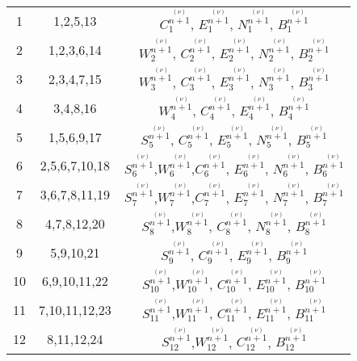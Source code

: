 \begin{center}
\begin{longtable}[htbp]{c c c}
		1	&	1,2,5,13	&	$C^{\stackrel{(\nu)}{n+1}}_{1}$, $E^{\stackrel{(\nu)}{n+1}}_{1}$, $N^{\stackrel{(\nu)}{n+1}}_{1}$, $B^{\stackrel{(\nu)}{n+1}}_{1}$ 	\\
		2	&	1,2,3,6,14	&	$W^{\stackrel{(\nu)}{n+1}}_{2}$, $C^{\stackrel{(\nu)}{n+1}}_{2}$, $E^{\stackrel{(\nu)}{n+1}}_{2}$, $N^{\stackrel{(\nu)}{n+1}}_{2}$, $B^{\stackrel{(\nu)}{n+1}}_{2}$	\\
		3	&	2,3,4,7,15	&	$W^{\stackrel{(\nu)}{n+1}}_{3}$, $C^{\stackrel{(\nu)}{n+1}}_{3}$, $E^{\stackrel{(\nu)}{n+1}}_{3}$, $N^{\stackrel{(\nu)}{n+1}}_{3}$, $B^{\stackrel{(\nu)}{n+1}}_{3}$	\\
		4	&	3,4,8,16	&	$W^{\stackrel{(\nu)}{n+1}}_{4}$, $C^{\stackrel{(\nu)}{n+1}}_{4}$, $E^{\stackrel{(\nu)}{n+1}}_{4}$, $B^{\stackrel{(\nu)}{n+1}}_{4}$	\\
		5	&	1,5,6,9,17	&	$S^{\stackrel{(\nu)}{n+1}}_{5}$, $C^{\stackrel{(\nu)}{n+1}}_{5}$, $E^{\stackrel{(\nu)}{n+1}}_{5}$, $N^{\stackrel{(\nu)}{n+1}}_{5}$, $B^{\stackrel{(\nu)}{n+1}}_{5}$	\\
		6	&	2,5,6,7,10,18	&	$S^{\stackrel{(\nu)}{n+1}}_{6}$,$W^{\stackrel{(\nu)}{n+1}}_{6}$,$C^{\stackrel{(\nu)}{n+1}}_{6}$, $E^{\stackrel{(\nu)}{n+1}}_{6}$, $N^{\stackrel{(\nu)}{n+1}}_{6}$, $B^{\stackrel{(\nu)}{n+1}}_{6}$	\\
		7	&	3,6,7,8,11,19	&	$S^{\stackrel{(\nu)}{n+1}}_{7}$,$W^{\stackrel{(\nu)}{n+1}}_{7}$,$C^{\stackrel{(\nu)}{n+1}}_{7}$, $E^{\stackrel{(\nu)}{n+1}}_{7}$, $N^{\stackrel{(\nu)}{n+1}}_{7}$, $B^{\stackrel{(\nu)}{n+1}}_{7}$	\\
		8	&	4,7,8,12,20	&	$S^{\stackrel{(\nu)}{n+1}}_{8}$,$W^{\stackrel{(\nu)}{n+1}}_{8}$, $C^{\stackrel{(\nu)}{n+1}}_{8}$, $N^{\stackrel{(\nu)}{n+1}}_{8}$, $B^{\stackrel{(\nu)}{n+1}}_{8}$	\\
		9	&	5,9,10,21	&	$S^{\stackrel{(\nu)}{n+1}}_{9}$, $C^{\stackrel{(\nu)}{n+1}}_{9}$, $E^{\stackrel{(\nu)}{n+1}}_{9}$, $B^{\stackrel{(\nu)}{n+1}}_{9}$	\\
		10	&	6,9,10,11,22	&	$S^{\stackrel{(\nu)}{n+1}}_{10}$,$W^{\stackrel{(\nu)}{n+1}}_{10}$, $C^{\stackrel{(\nu)}{n+1}}_{10}$, $E^{\stackrel{(\nu)}{n+1}}_{10}$, $B^{\stackrel{(\nu)}{n+1}}_{10}$	\\
		11	&	7,10,11,12,23	&	$S^{\stackrel{(\nu)}{n+1}}_{11}$,$W^{\stackrel{(\nu)}{n+1}}_{11}$, $C^{\stackrel{(\nu)}{n+1}}_{11}$, $E^{\stackrel{(\nu)}{n+1}}_{11}$, $B^{\stackrel{(\nu)}{n+1}}_{11}$	\\
		12	&	8,11,12,24	&	$S^{\stackrel{(\nu)}{n+1}}_{12}$,$W^{\stackrel{(\nu)}{n+1}}_{12}$, $C^{\stackrel{(\nu)}{n+1}}_{12}$,  $B^{\stackrel{(\nu)}{n+1}}_{12}$	\\

\end{longtable}
\end{center}
